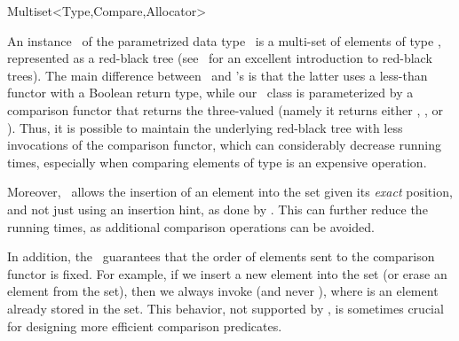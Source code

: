 

\begin{ccRefClass}{Multiset<Type,Compare,Allocator>}
\label{class:cgal_multimap}

\ccDefinition

An instance \ccVar\ of the parametrized data type \ccRefName\ is a
multi-set of elements of type , represented as a red-black tree
(see~\cite[Chapter~13]{clrs-ia-01} for an excellent introduction to red-black
trees).
The main difference between \ccRefName\ and \stl's  is that
the latter uses a less-than functor with a Boolean return type, while our
\ccRefName\ class is parameterized by a comparison functor  that
returns the three-valued  (namely it returns either
, , or ). Thus, it is possible to maintain
the underlying red-black tree with less invocations of the comparison functor,
which can considerably decrease running times, especially when comparing
elements of type  is an expensive operation.

Moreover, \ccRefName\ allows the insertion of an element into the set given
its {\em exact} position, and not just using an insertion hint, as done by 
. This can further reduce the running times, as additional
comparison operations can be avoided.

In addition, the \ccRefName\ guarantees that the order of elements sent to the
comparison functor is fixed. For example, if we insert a new element 
into the set (or erase an element from the set), then we always invoke 
 (and never ), where  is an
element already stored in the set. This behavior, not supported by
, is sometimes crucial for designing more efficient
comparison predicates.


\end{ccRefClass}

